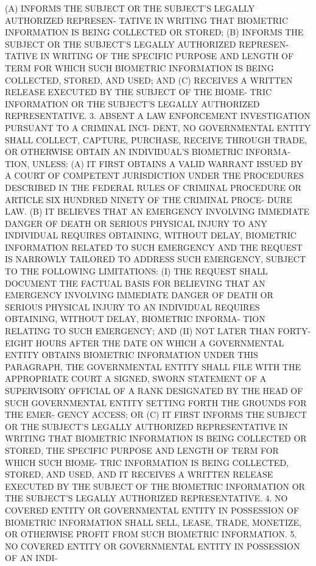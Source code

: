    (A)  INFORMS THE SUBJECT OR THE SUBJECT'S LEGALLY AUTHORIZED REPRESEN-
 TATIVE IN WRITING THAT  BIOMETRIC  INFORMATION  IS  BEING  COLLECTED  OR
 STORED;
   (B)  INFORMS THE SUBJECT OR THE SUBJECT'S LEGALLY AUTHORIZED REPRESEN-
 TATIVE IN WRITING OF THE SPECIFIC PURPOSE AND LENGTH OF TERM  FOR  WHICH
 SUCH BIOMETRIC INFORMATION IS BEING COLLECTED, STORED, AND USED; AND
   (C)  RECEIVES  A WRITTEN RELEASE EXECUTED BY THE SUBJECT OF THE BIOME-
 TRIC INFORMATION OR THE SUBJECT'S LEGALLY AUTHORIZED REPRESENTATIVE.
   3. ABSENT A LAW ENFORCEMENT INVESTIGATION PURSUANT TO A CRIMINAL INCI-
 DENT, NO GOVERNMENTAL ENTITY SHALL COLLECT, CAPTURE,  PURCHASE,  RECEIVE
 THROUGH  TRADE,  OR  OTHERWISE OBTAIN AN INDIVIDUAL'S BIOMETRIC INFORMA-
 TION, UNLESS:
   (A) IT FIRST OBTAINS A VALID WARRANT ISSUED BY A  COURT  OF  COMPETENT
 JURISDICTION  UNDER  THE  PROCEDURES  DESCRIBED  IN THE FEDERAL RULES OF
 CRIMINAL PROCEDURE OR ARTICLE SIX HUNDRED NINETY OF THE CRIMINAL  PROCE-
 DURE LAW.
   (B)  IT BELIEVES THAT AN EMERGENCY INVOLVING IMMEDIATE DANGER OF DEATH
 OR SERIOUS PHYSICAL INJURY TO ANY INDIVIDUAL REQUIRES OBTAINING, WITHOUT
 DELAY, BIOMETRIC INFORMATION RELATED TO SUCH EMERGENCY AND  THE  REQUEST
 IS NARROWLY TAILORED TO ADDRESS SUCH EMERGENCY, SUBJECT TO THE FOLLOWING
 LIMITATIONS:
   (I) THE REQUEST SHALL DOCUMENT THE FACTUAL BASIS FOR BELIEVING THAT AN
 EMERGENCY INVOLVING IMMEDIATE DANGER OF DEATH OR SERIOUS PHYSICAL INJURY
 TO  AN  INDIVIDUAL REQUIRES OBTAINING, WITHOUT DELAY, BIOMETRIC INFORMA-
 TION RELATING TO SUCH EMERGENCY; AND
   (II) NOT LATER THAN FORTY-EIGHT  HOURS  AFTER  THE  DATE  ON  WHICH  A
 GOVERNMENTAL  ENTITY OBTAINS BIOMETRIC INFORMATION UNDER THIS PARAGRAPH,
 THE GOVERNMENTAL ENTITY SHALL FILE WITH THE APPROPRIATE COURT A  SIGNED,
 SWORN  STATEMENT  OF  A SUPERVISORY OFFICIAL OF A RANK DESIGNATED BY THE
 HEAD OF SUCH GOVERNMENTAL ENTITY SETTING FORTH THE GROUNDS FOR THE EMER-
 GENCY ACCESS; OR
   (C) IT FIRST INFORMS THE SUBJECT OR THE SUBJECT'S  LEGALLY  AUTHORIZED
 REPRESENTATIVE  IN WRITING THAT BIOMETRIC INFORMATION IS BEING COLLECTED
 OR STORED, THE SPECIFIC PURPOSE AND LENGTH OF TERM FOR WHICH SUCH BIOME-
 TRIC INFORMATION IS BEING COLLECTED, STORED, AND USED, AND IT RECEIVES A
 WRITTEN RELEASE EXECUTED BY THE SUBJECT OF THE BIOMETRIC INFORMATION  OR
 THE SUBJECT'S LEGALLY AUTHORIZED REPRESENTATIVE.
   4. NO COVERED ENTITY OR GOVERNMENTAL ENTITY IN POSSESSION OF BIOMETRIC
 INFORMATION SHALL SELL, LEASE, TRADE, MONETIZE, OR OTHERWISE PROFIT FROM
 SUCH BIOMETRIC INFORMATION.
   5.  NO COVERED ENTITY OR GOVERNMENTAL ENTITY IN POSSESSION OF AN INDI-
